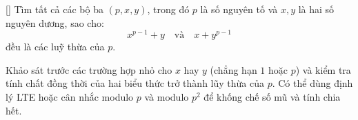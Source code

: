\documentclass[../04-diophantine-equations.tex]{subfiles}
\begin{document}
\begin{exercise*}\label{example:FRA-2015-TST3-P9}[\textbf{}]
    Tìm tất cả các bộ ba \( (p, x, y) \), trong đó \( p \) là số nguyên tố và \( x, y \) là hai số nguyên dương, sao cho:
    \[
        x^{p-1} + y \quad \text{và} \quad x + y^{p-1}
    \]
    đều là các luỹ thừa của \( p \).
\end{exercise*}

\begin{remark*}
    Khảo sát trước các trường hợp nhỏ cho \(x\) hay \(y\) (chẳng hạn \(1\) hoặc \(p\)) và kiểm tra tính chất đồng thời của hai biểu thức trở thành lũy thừa của \(p\).  
    Có thể dùng định lý LTE hoặc cân nhắc modulo \(p\) và modulo \(p^2\) để khống chế số mũ và tính chia hết.
\end{remark*}
\end{document}
